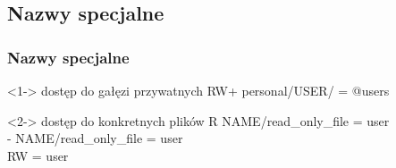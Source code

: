\documentclass[10pt]{beamer}
\begin{document}
\subsection{Nazwy specjalne}
\begin{frame}
	\frametitle{Nazwy specjalne}
	\begin{block}<1->
	{dostęp do gałęzi przywatnych}
	RW+ personal/USER/ = @users
	\end{block}
	\begin{block}<2->
	{dostęp do konkretnych plików}
	R NAME/read\_only\_file = user\\
	- NAME/read\_only\_file = user\\
	RW = user
	\end{block}
\end{frame}
\end{document}
